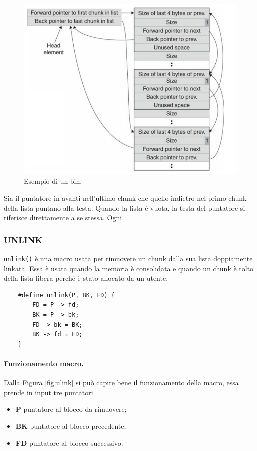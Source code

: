 \begin{figure}[H]
    \centering
    \includegraphics[width=12cm, keepaspectratio]{capitoli/secure_coding/img/cap_4/bin.png}
    \caption{Esempio di un bin.}\label{fig:bin}
\end{figure}
Sia il puntatore in avanti nell'ultimo chunk che quello indietro nel primo chunk della
lista puntano alla testa. Quando la lista è vuota, la testa del puntatore si riferisce
direttamente a se stessa.  Ogni %

\subsubsection{UNLINK}

\verb|unlink()| è una macro usata per rimuovere un chunk dalla sua lista doppiamente
linkata. Essa è usata quando la memoria è consolidata e quando un chunk è tolto della
lista libera perché è stato allocato da un utente.

\begin{verbatim}
    #define unlink(P, BK, FD) {
        FD = P -> fd;
        BK = P -> bk;
        FD -> bk = BK;
        BK -> fd = FD;
    }
\end{verbatim}

\paragraph{Funzionamento macro.}
Dalla Figura \ref{fig:ulink} si può capire bene il funzionamento della macro,
essa prende in input tre puntatori

\begin{itemize}
    \item \textbf{P} puntatore al blocco da rimuovere;
    \item \textbf{BK} puntatore al blocco precedente;
    \item \textbf{FD} puntatore al blocco successivo.
\end{itemize}

